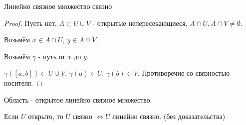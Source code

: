 \begin{theorem} \thmslashn

    Линейно связное множество связно

    \begin{proof} \thmslashn
    
        Пусть нет, $A \subset U \cup V$ - открытые непересекающиеся, $A\cap U, A\cap V \neq \emptyset $.

        Возьмём $x\in A\cap U$, $y\in A\cap V$.

        Возьмём $\gamma$ - путь от $x$ до $y$.

        $\gamma([a, b]) \subset U \cup V$, $\gamma(a)\in U$, $\gamma(b)\in V$. Противоречие со связностью носителя.
    \end{proof}
\end{theorem}
\begin{definition} \thmslashn 

    Область - открытое линейно связное множество.
\end{definition}
\begin{remark} \thmslashn

    Если $U$ открыто, то $U$ связно $\iff U$ линейно связно. (без доказательства)
\end{remark}
